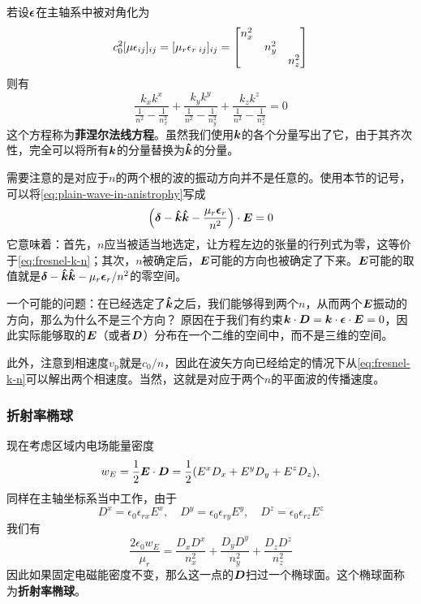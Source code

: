 \documentclass[UTF8, a4paper]{ctexart}
\begin{document}
若设$\vb*{\epsilon}$在主轴系中被对角化为
\begin{equation}
    c_0^2 [\mu \epsilon_{ij}]_{ij} = [\mu_r \epsilon_{r\;ij}]_{ij} = \bmqty{\dmat{n_x^2, n_y^2, n_z^2}}
    \label{eq:diag-two-axis}
\end{equation}
则有
\begin{equation}
    \frac{k_x k^x}{\frac{1}{n^2} - \frac{1}{n_x^2}} + \frac{k_y k^y}{\frac{1}{n^2} - \frac{1}{n_y^2}} + \frac{k_z k^z}{\frac{1}{n^2} - \frac{1}{n_z^2}} = 0
\end{equation}
这个方程称为\textbf{菲涅尔法线方程}。虽然我们使用$\vb*{k}$的各个分量写出了它，由于其齐次性，完全可以将所有$\vb*{k}$的分量替换为$\vu*{k}$的分量。

需要注意的是对应于$n$的两个根的波的振动方向并不是任意的。使用本节的记号，可以将\eqref{eq:plain-wave-in-anistrophy}写成
\begin{equation}
    \left(\vb*{\delta} - \vu*{k}\vu*{k} - \frac{\mu_r \vb*{\epsilon}_r}{n^2} \right) \cdot \vb*{E} = 0
\end{equation}
它意味着：首先，$n$应当被适当地选定，让方程左边的张量的行列式为零，这等价于\eqref{eq:fresnel-k-n}；其次，$n$被确定后，$\vb*{E}$可能的方向也被确定了下来。$\vb*{E}$可能的取值就是$\vb*{\delta} - \vu*{k}\vu*{k} - \mu_r \vb*{\epsilon}_r / n^2$的零空间。

一个可能的问题：在已经选定了$\vu*{k}$之后，我们能够得到两个$n$，从而两个$\vb*{E}$振动的方向，那么为什么不是三个方向？
原因在于我们有约束$\vb*{k} \cdot \vb*{D} = \vb*{k} \cdot \vb*{\epsilon} \cdot \vb*{E} = 0$，因此实际能够取的$\vb*{E}$（或者$\vb*{D}$）分布在一个二维的空间中，而不是三维的空间。

此外，注意到相速度$v_\text{p}$就是$c_0 / n$，因此在波矢方向已经给定的情况下从\eqref{eq:fresnel-k-n}可以解出两个相速度。当然，这就是对应于两个$n$的平面波的传播速度。

\subsubsection{折射率椭球}

现在考虑区域内电场能量密度
\[
    w_E = \frac{1}{2} \vb*{E} \cdot \vb*{D} = \frac{1}{2} (E^x D_x + E^y D_y + E^z D_z),
\]
同样在主轴坐标系当中工作，由于
\[
    D^x = \epsilon_0 \epsilon_{rx} E^x, \quad D^y = \epsilon_0 \epsilon_{ry} E^y, \quad D^z = \epsilon_0 \epsilon_{rz} E^z
\]
我们有
\begin{equation}
    \frac{2 \epsilon_0 w_E}{\mu_r} = \frac{D_x D^x}{n_x^2} + \frac{D_y D^y}{n_y^2} + \frac{D_z D^z}{n_z^2}
\end{equation}
因此如果固定电磁能密度不变，那么这一点的$\vb*{D}$扫过一个椭球面。这个椭球面称为\textbf{折射率椭球}。
\end{document}
